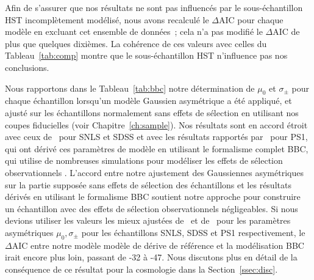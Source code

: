 \documentclass[../main/main.tex]{subfiles}
\begin{document}
Afin de s'assurer que nos résultats ne sont pas influencés par le
sous-échantillon HST incomplètement modélisé, nous avons recalculé le
$\Delta$AIC pour chaque modèle en excluant cet ensemble de données~; cela n'a
pas modifié le $\Delta$AIC de plus que quelques dixièmes. La cohérence de ces
valeurs avec celles du Tableau~\ref{tab:comp} montre que le sous-échantillon HST
n'influence pas nos conclusions.

Nous rapportons dans le Tableau~\ref{tab:bbc} notre détermination de $\mu_0$ et
$\sigma_{\pm}$ pour chaque échantillon lorsqu'un modèle Gaussien asymétrique a
été appliqué, et ajusté sur les échantillons normalement sans effets de
sélection en utilisant nos coupes fiducielles (voir Chapitre~\ref{ch:sample}).
Nos résultats sont en accord étroit avec ceux de~\cite{scolnic2016} pour SNLS et
SDSS et avec les résultats rapportés par~\cite{scolnic2018} pour PS1, qui ont
dérivé ces paramètres de modèle en utilisant le formalisme complet BBC, qui
utilise de nombreuses simulations pour modéliser les effets de sélection
observationnels \citep[voir les détails par exemple Section~3 de][et le
Chapitre~\ref{ch:snana}]{kessler2017}. L'accord entre notre ajustement des
Gaussiennes asymétriques sur la partie supposée sans effets de sélection des
échantillons et les résultats dérivés en utilisant le formalisme BBC soutient
notre approche pour construire un échantillon avec des effets de sélection
observationnels négligeables. Si nous devions utiliser les valeurs les mieux
ajustées de~\cite{scolnic2016} et de~\cite{scolnic2018} pour les paramètres
asymétriques $\mu_0,\sigma_{\pm}$ pour les échantillons SNLS, SDSS et PS1
respectivement, le $\Delta$AIC entre notre modèle modèle de dérive de référence
et la modélisation BBC irait encore plus loin, passant de -32 à -47. Nous
discutons plus en détail de la conséquence de ce résultat pour la cosmologie
dans la Section~\ref{ssec:disc}.
\end{document}
